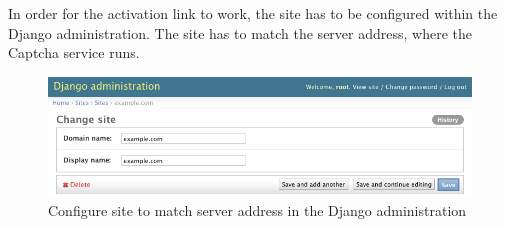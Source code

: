 In order for the activation link to work, the site has to be configured within the Django administration. The site has to match the server address, where the Captcha service runs.
\begin{figure}[H]
\centering
\includegraphics[width=1\linewidth]{content/figures/site_administration.png}
\caption{Configure site to match server address in the Django administration}
\label{fig:site_administration}
\end{figure}

\clearpage
